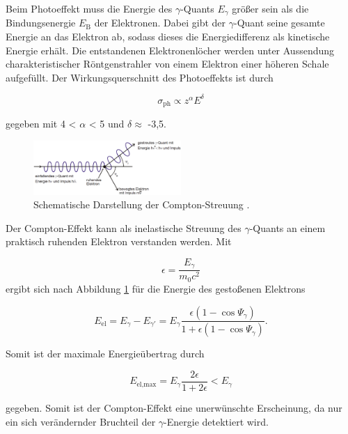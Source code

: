 Beim Photoeffekt muss die Energie des $\gamma$-Quants $E_\gamma$ größer sein als die Bindungsenergie $E_\text{B}$ der Elektronen.
Dabei gibt der $\gamma$-Quant seine gesamte Energie an das Elektron ab, sodass dieses die Energiedifferenz als kinetische Energie erhält.
Die entstandenen Elektronenlöcher werden unter Aussendung charakteristischer Röntgenstrahler von einem Elektron einer höheren Schale aufgefüllt.
Der Wirkungsquerschnitt des Photoeffekts ist durch

\begin{equation}
	\sigma_\text{ph} \propto z^\alpha E^\delta \label{photo_quer}
\end{equation}

gegeben mit 4 < $\alpha$ < 5 und $\delta \approx$ -3,5.\\

\begin{figure}
	\centering
	\includegraphics[width = 0.5\textwidth]{pic/compton.png}
	\caption{Schematische Darstellung der Compton-Streuung \cite{anleitung}.}
	\label{compton}
\end{figure}

Der Compton-Effekt kann als inelastische Streuung des $\gamma$-Quants an einem praktisch ruhenden Elektron verstanden werden.
Mit

\begin{equation}
	\epsilon = \frac{E_\gamma}{m_\text{0} c^2}
\end{equation}
ergibt sich nach Abbildung \ref{compton} für die Energie des gestoßenen Elektrons

\begin{equation}
	E_\text{el} = E_\gamma - E_{\gamma'} = E_\gamma \frac{\epsilon (1-\cos{\Psi_\gamma})}{1 + \epsilon (1-\cos{\Psi_\gamma})} .
\end{equation}

Somit ist der maximale Energieübertrag durch

\begin{equation}
	E_\text{el,max} = E_\gamma \frac{2\epsilon}{1+2\epsilon} < E_\gamma
\end{equation}

gegeben.
Somit ist der Compton-Effekt eine unerwünschte Erscheinung, da nur ein sich verändernder Bruchteil der $\gamma$-Energie detektiert wird.\\

